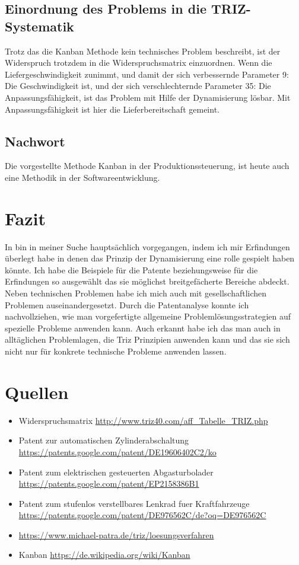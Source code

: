 \documentclass{article}
\begin{document}
\subsection{Einordnung des Problems in die TRIZ-Systematik}
Trotz das die Kanban Methode kein technisches Problem beschreibt, ist der Widerspruch trotzdem in die Widerspruchsmatrix einzuordnen.
Wenn die Liefergeschwindigkeit zunimmt, und damit der sich verbessernde Parameter  9: Die Geschwindigkeit ist, und der sich verschlechternde Parameter  35: Die Anpassungsfähigkeit, ist das Problem mit Hilfe der Dynamisierung lösbar.
Mit Anpassungsfähigkeit ist hier die Lieferbereitschaft gemeint.

\subsection{Nachwort}
Die vorgestellte Methode Kanban in der Produktionssteuerung, ist heute auch eine Methodik in der Softwareentwicklung. 

\section{Fazit}
In bin in meiner Suche hauptsächlich vorgegangen, indem ich mir Erfindungen überlegt habe in denen das Prinzip der Dynamisierung eine rolle gespielt haben könnte. Ich habe die Beispiele für die Patente beziehungsweise für die Erfindungen so ausgewählt das sie möglichst breitgefächerte Bereiche abdeckt. Neben technischen Problemen habe ich mich auch mit gesellschaftlichen Problemen auseinandergesetzt. 
Durch die Patentanalyse konnte ich nachvollziehen, wie man vorgefertigte allgemeine Problemlösungsstrategien auf spezielle Probleme anwenden kann.
Auch erkannt habe ich das man auch in alltäglichen Problemlagen, die Triz Prinzipien anwenden kann und das sie sich nicht nur für konkrete technische Probleme anwenden lassen.

\section{Quellen}

\begin{itemize}
\item {Widerspruchsmatrix}
  \url{http://www.triz40.com/aff_Tabelle_TRIZ.php}
\item {Patent zur automatischen Zylinderabschaltung}
  \url{https://patents.google.com/patent/DE19606402C2/ko}
\item {Patent zum elektrischen gesteuerten Abgasturbolader}
	\url{https://patents.google.com/patent/EP2158386B1}
\item {Patent zum stufenlos verstellbares Lenkrad fuer Kraftfahrzeuge}
	\url{https://patents.google.com/patent/DE976562C/de?oq=DE976562C}
\item 
	\url{https://www.michael-patra.de/triz/loesungsverfahren}
\item {Kanban}
	\url{https://de.wikipedia.org/wiki/Kanban}
\end{itemize}
\end{document}
